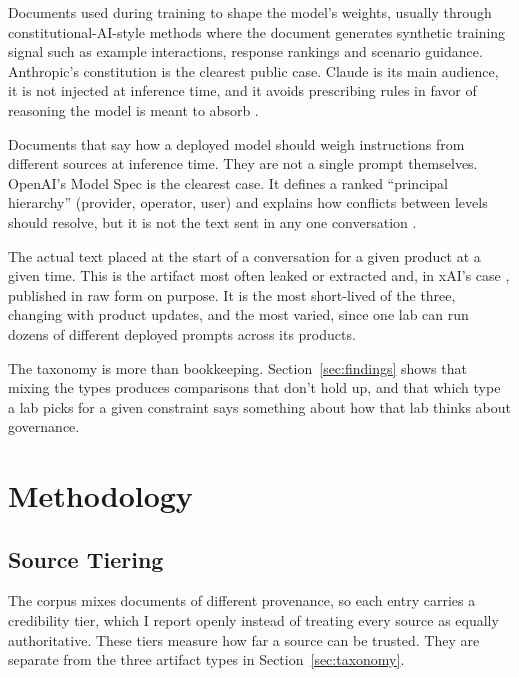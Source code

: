 \documentclass[11pt]{article}
\begin{document}
\begin{description}[itemsep=6pt]
  \item[Training-time constitutions.] Documents used during training to shape
    the model's weights, usually through constitutional-AI-style methods where
    the document generates synthetic training signal such as example
    interactions, response rankings and scenario guidance. Anthropic's
    constitution is the clearest public case. Claude is its main audience, it
    is not injected at inference time, and it avoids prescribing rules in
    favor of reasoning the model is meant to absorb
    \citep{anthropic2026constitution}.
  \item[Runtime authority specifications.] Documents that say how a deployed
    model should weigh instructions from different sources at inference
    time. They are not a single prompt themselves. OpenAI's Model Spec is the
    clearest case. It defines a ranked ``principal hierarchy'' (provider,
    operator, user) and explains how conflicts between levels should resolve,
    but it is not the text sent in any one conversation
    \citep{openai2025modelspec}.
  \item[Deployed inference-time system prompts.] The actual text placed at the
    start of a conversation for a given product at a given time. This is the
    artifact most often leaked or extracted and, in xAI's case
    \citep{xaigrokrepo2026}, published in raw form on purpose. It is the most
    short-lived of the three, changing with product updates, and the most
    varied, since one lab can run dozens of different deployed prompts across
    its products.
\end{description}

The taxonomy is more than bookkeeping. Section~\ref{sec:findings} shows that
mixing the types produces comparisons that don't hold up, and that which type
a lab picks for a given constraint says something about how that lab thinks
about governance.

\section{Methodology}
\label{sec:methodology}

\subsection{Source Tiering}
The corpus mixes documents of different provenance, so each entry carries a
credibility tier, which I report openly instead of treating every source as
equally authoritative. These tiers measure how far a source can be trusted.
They are separate from the three artifact types in
Section~\ref{sec:taxonomy}.
\end{document}
